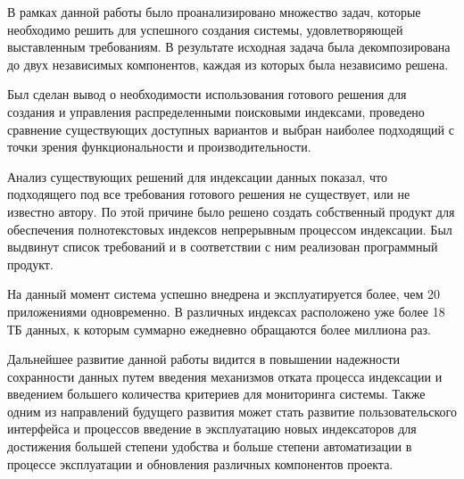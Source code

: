 
В рамках данной работы было проанализировано множество задач, которые необходимо решить для успешного создания системы, удовлетворяющей выставленным требованиям. В результате исходная задача была декомпозирована до двух независимых компонентов, каждая из которых была независимо решена.

Был сделан вывод о необходимости использования готового решения для создания и управления распределенными поисковыми индексами, проведено сравнение существующих доступных вариантов и выбран наиболее подходящий с точки зрения функциональности и производительности.

Анализ существующих решений для индексации данных показал, что подходящего под все требования готового решения не существует, или не известно автору. По этой причине было решено создать собственный продукт для обеспечения полнотекстовых индексов непрерывным процессом индексации. Был выдвинут список требований и в соответствии с ним реализован программный продукт.

На данный момент система успешно внедрена и эксплуатируется более, чем 20 приложениями одновременно. В различных индексах расположено уже более 18 ТБ данных, к которым суммарно ежедневно обращаются более миллиона раз.

Дальнейшее развитие данной работы видится в повышении надежности сохранности данных путем введения механизмов отката процесса индексации и введением большего количества критериев для мониторинга системы. Также одним из направлений будущего развития может стать развитие пользовательского интерфейса и процессов введение в эксплуатацию новых индексаторов для достижения большей степени удобства и больше степени автоматизации в процессе эксплуатации и обновления различных компонентов проекта.

\clearpage
